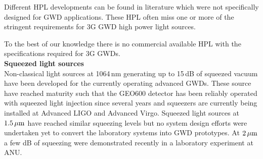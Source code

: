 Different HPL developments can be found in literature which were not specifically designed for GWD applications. These HPL often miss one or more of the stringent requirements for 3G GWD high power light sources.

To the best of our knowledge there is no commercial available HPL with the specifications required for 3G GWDs.\\

{\bf Squeezed light sources}\\
Non-classical light sources at 1064\,nm generating up to 15\,dB of squeezed vacuum have been developed for the currently operating advanced GWDs. These source have reached maturity such that the GEO600 detector has been reliably operated with squeezed light injection since several years and squeezers are currently being installed at Advanced LIGO and Advanced Virgo.
Squeezed light sources at $ 1.5\, {\rm \mu m}$ have reached similar squeezing levels but no system design efforts were undertaken yet to convert the laboratory systems into GWD prototypes.
At $ 2\, {\rm \mu m}$ a few dB of squeezing were demonstrated recently in a laboratory experiment {\color{red} at ANU}.



%
%

